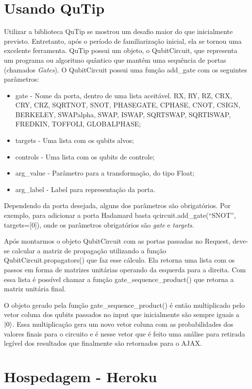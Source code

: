 \documentclass[a4paper, 12pt, oneside]{book}
\begin{document}
\section{Usando QuTip}

Utilizar a biblioteca QuTip se mostrou um desafio maior do que inicialmente previsto. Entretanto, após o período de familiarização inicial, ela se tornou uma excelente ferramenta. QuTip possui um objeto, o QubitCircuit, que representa um programa ou algoritmo quântico que mantém uma sequência de portas (chamados \textit{Gates}). O QubitCircuit possui uma função add\_gate com os seguintes parâmetros:
\begin{itemize}
\item gate - Nome da porta, dentro de uma lista aceitável. RX, RY, RZ, CRX, CRY, CRZ, SQRTNOT, SNOT, PHASEGATE, CPHASE, CNOT, CSIGN, BERKELEY, SWAPalpha, SWAP, ISWAP, SQRTSWAP, SQRTISWAP, FREDKIN, TOFFOLI, GLOBALPHASE;
\item targets - Uma lista com os qubits alvos;
\item controls - Uma lista com os qubits de controle;
\item arg\_value - Parâmetro para a transformação, do tipo Float;
\item arg\_label - Label para representação da porta.
\end{itemize}

Dependendo da porta desejada, alguns dos parâmetros são obrigatórios. Por exemplo, para adicionar a porta Hadamard basta qcircuit.add\_gate(``SNOT'', targets=[0]), onde os parâmetros obrigatórios são \textit{gate} e \textit{targets}.

Após montarmos o objeto QubitCircuit com as portas passadas no Request, deve-se calcular a matriz de propagação utilizando a função QubitCircuit.propagators() que faz esse cálculo. Ela retorna uma lista com os passos em forma de matrizes unitárias operando da esquerda para a direita. Com essa lista é possível chamar a função gate\_sequence\_product() que retorna a matriz unitária final.

O objeto gerado pela função gate\_sequence\_product() é então multiplicado pelo vetor coluna dos qubits passados no input que inicialmente são sempre iguais a $\ket{0}$. Essa multiplicação gera um novo vetor coluna com as probabilidades dos valores finais para o circuito e é nesse vetor que é feito uma análise para retirada legível dos resultados que finalmente são retornados para o AJAX.

\section{Hospedagem - Heroku}
\end{document}
